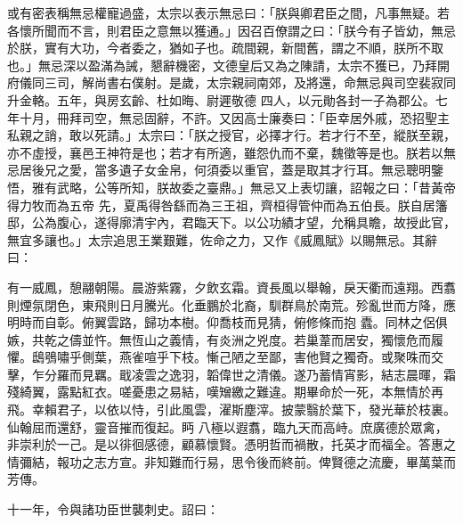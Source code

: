 \begin{pinyinscope}
 或有密表稱無忌權寵過盛，太宗以表示無忌曰：「朕與卿君臣之間，凡事無疑。若各懷所聞而不言，則君臣之意無以獲通。」因召百僚謂之曰：「朕今有子皆幼，無忌於朕，實有大功，今者委之，猶如子也。疏間親，新間舊，謂之不順，朕所不取也。」無忌深以盈滿為誡，懇辭機密，文德皇后又為之陳請，太宗不獲已，乃拜開府儀同三司，解尚書右僕射。是歲，太宗親祠南郊，及將還，命無忌與司空裴寂同升金輅。五年，與房玄齡、杜如晦、尉遲敬德
 四人，以元勛各封一子為郡公。七年十月，冊拜司空，無忌固辭，不許。又因高士廉奏曰：「臣幸居外戚，恐招聖主私親之誚，敢以死請。」太宗曰：「朕之授官，必擇才行。若才行不至，縱朕至親，亦不虛授，襄邑王神符是也；若才有所適，雖怨仇而不棄，魏徵等是也。朕若以無忌居後兄之愛，當多遺子女金帛，何須委以重官，蓋是取其才行耳。無忌聰明鑒悟，雅有武略，公等所知，朕故委之臺鼎。」無忌又上表切讓，詔報之曰：「昔黃帝得力牧而為五帝
 先，夏禹得咎繇而為三王祖，齊桓得管仲而為五伯長。朕自居籓邸，公為腹心，遂得廓清宇內，君臨天下。以公功績才望，允稱具瞻，故授此官，無宜多讓也。」太宗追思王業艱難，佐命之力，又作《威鳳賦》以賜無忌。其辭曰：



 有一威鳳，憩翮朝陽。晨游紫霧，夕飲玄霜。資長風以舉翰，戾天衢而遠翔。西翥則煙氛閉色，東飛則日月騰光。化垂鵬於北裔，馴群鳥於南荒。殄亂世而方降，應明時而自彰。俯翼雲路，歸功本樹。仰喬枝而見猜，俯修條而抱
 蠹。同林之侶俱嫉，共乾之儔並忤。無恆山之義情，有炎洲之兇度。若巢葦而居安，獨懷危而履懼。鴟鴞嘯乎側葉，燕雀喧乎下枝。慚己陋之至鄙，害他賢之獨奇。或聚咮而交擊，乍分羅而見羈。戢凌雲之逸羽，韜偉世之清儀。遂乃蓄情宵影，結志晨暉，霜殘綺翼，露點紅衣。嗟憂患之易結，嘆矰繳之難違。期畢命於一死，本無情於再飛。幸賴君子，以依以恃，引此風雲，濯斯塵滓。披蒙翳於葉下，發光華於枝裏。仙翰屈而還舒，靈音摧而復起。眄
 八極以遐翥，臨九天而高峙。庶廣德於眾禽，非崇利於一己。是以徘徊感德，顧慕懷賢。憑明哲而禍散，托英才而福全。答惠之情彌結，報功之志方宣。非知難而行易，思令後而終前。俾賢德之流慶，畢萬葉而芳傳。



 十一年，令與諸功臣世襲刺史。詔曰：




\end{pinyinscope}
